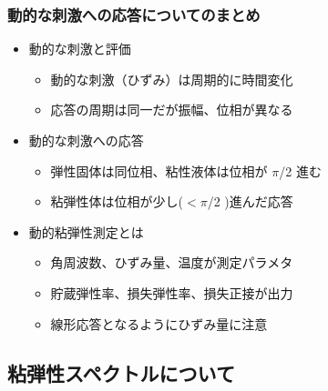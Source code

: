 \documentclass[12pt, dvipdfmx]{beamer}
\begin{document}
\begin{frame}
	\frametitle{動的な刺激への応答についてのまとめ}
        \begin{boxnote}
            \vspace{-3mm}
            \begin{itemize}
                \item 動的な刺激と評価
                    \begin{itemize}
                        \item 動的な刺激（ひずみ）は周期的に時間変化
                        \item 応答の周期は同一だが振幅、位相が異なる
                    \end{itemize} 
                \item 動的な刺激への応答
                    \begin{itemize}
                        \item 弾性固体は同位相、粘性液体は位相が $\pi$/2 進む
                        \item 粘弾性体は位相が少し($<\pi$/2 )進んだ応答
                    \end{itemize} 
                \item 動的粘弾性測定とは
                    \begin{itemize}
                        \item 角周波数、ひずみ量、温度が測定パラメタ
                        \item 貯蔵弾性率、損失弾性率、損失正接が出力
                        \item 線形応答となるようにひずみ量に注意
                    \end{itemize}
            \end{itemize}
        \end{boxnote}
\end{frame}

\subsection{粘弾性スペクトルについて}
\end{document}
